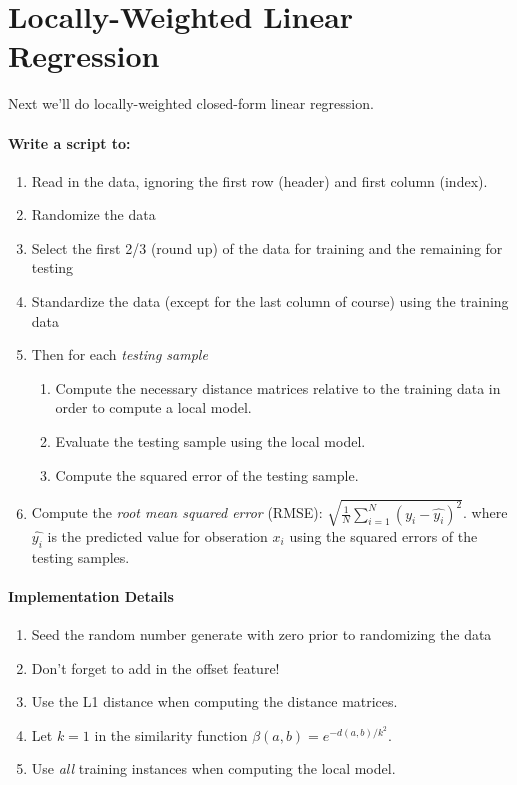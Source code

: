 \documentclass[12pt]{article}
\begin{document}
\newpage
\section{Locally-Weighted Linear Regression}
\noindent
Next we'll do locally-weighted closed-form linear regression.\\

\paragraph{Write a script to:}
\begin{enumerate}
  \item Read in the data, ignoring the first row (header) and first column (index).
  \item Randomize the data
  \item Select the first 2/3 (round up) of the data for training and the remaining for testing
  \item Standardize the data (except for the last column of course) using the training data
  \item Then for each \emph{testing sample}
  	\begin{enumerate}
  	\item Compute the necessary distance matrices relative to the training data in order to compute a local model.
  	\item Evaluate the testing sample using the local model.
  	\item Compute the squared error of the testing sample.
  	\end{enumerate}
  \item Compute the \emph{root mean squared error} (RMSE): $\sqrt{\frac{1}{N}\sum_{i=1}^N (y_i-\hat{y_i})^2}$. where $\hat{y_i}$ is the predicted value for obseration $x_i$ using the squared errors of the testing samples.
\end{enumerate}


\paragraph{Implementation Details}
\begin{enumerate}
\item Seed the random number generate with zero prior to randomizing the data
\item Don't forget to add in the offset feature!
\item Use the L1 distance when computing the distance matrices.
\item Let $k=1$ in the similarity function $\beta(a,b)= e^{-d(a,b)/k^2}$.
\item Use \emph{all} training instances when computing the local model.
\end{enumerate}
\end{document}
